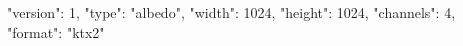 {
  "version": 1,
  "type": "albedo",
  "width": 1024,
  "height": 1024,
  "channels": 4,
  "format": "ktx2"
}
